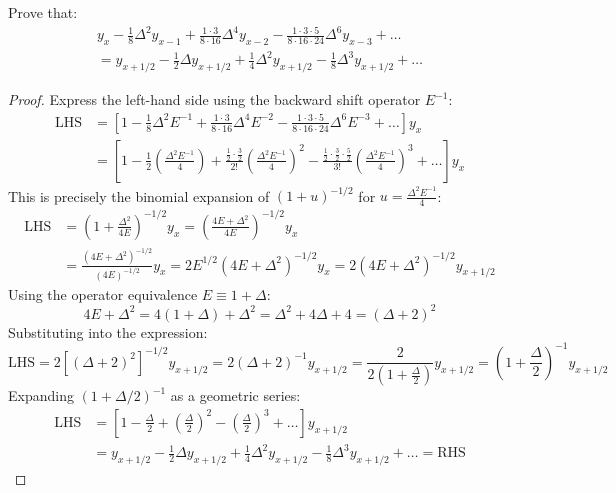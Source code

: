 \documentclass[11pt,a4paper]{article}
\begin{document}
\begin{theorembox}
Prove that:
\begin{multline}
    y_x - \frac{1}{8}\Delta^2 y_{x-1} + \frac{1 \cdot 3}{8 \cdot 16}\Delta^4 y_{x-2} - \frac{1 \cdot 3 \cdot 5}{8 \cdot 16 \cdot 24}\Delta^6 y_{x-3} + \dots \\
    = y_{x+1/2} - \frac{1}{2}\Delta y_{x+1/2} + \frac{1}{4}\Delta^2 y_{x+1/2} - \frac{1}{8}\Delta^3 y_{x+1/2} + \dots
\end{multline}
\end{theorembox}
\begin{proof}
Express the left-hand side using the backward shift operator $E^{-1}$:
\begin{align*}
    \text{LHS} &= \left[ 1 - \frac{1}{8}\Delta^2 E^{-1} + \frac{1 \cdot 3}{8 \cdot 16}\Delta^4 E^{-2} - \frac{1 \cdot 3 \cdot 5}{8 \cdot 16 \cdot 24}\Delta^6 E^{-3} + \dots \right] y_x \\
    &= \left[ 1 - \frac{1}{2}\left(\frac{\Delta^2 E^{-1}}{4}\right) + \frac{\frac{1}{2}\cdot\frac{3}{2}}{2!}\left(\frac{\Delta^2 E^{-1}}{4}\right)^2 - \frac{\frac{1}{2}\cdot\frac{3}{2}\cdot\frac{5}{2}}{3!}\left(\frac{\Delta^2 E^{-1}}{4}\right)^3 + \dots \right] y_x
\end{align*}
This is precisely the binomial expansion of $(1 + u)^{-1/2}$ for $u = \frac{\Delta^2 E^{-1}}{4}$:
\begin{align*}
    \text{LHS} &= \left( 1 + \frac{\Delta^2}{4E} \right)^{-1/2} y_x = \left( \frac{4E + \Delta^2}{4E} \right)^{-1/2} y_x \\
    &= \frac{(4E + \Delta^2)^{-1/2}}{(4E)^{-1/2}} y_x = 2 E^{1/2} (4E + \Delta^2)^{-1/2} y_x = 2(4E + \Delta^2)^{-1/2} y_{x+1/2}
\end{align*}
Using the operator equivalence $E \equiv 1 + \Delta$:
$$4E + \Delta^2 = 4(1 + \Delta) + \Delta^2 = \Delta^2 + 4\Delta + 4 = (\Delta + 2)^2$$
Substituting into the expression:
$$\text{LHS} = 2\left[ (\Delta + 2)^2 \right]^{-1/2} y_{x+1/2} = 2(\Delta + 2)^{-1} y_{x+1/2} = \frac{2}{2\left(1 + \frac{\Delta}{2}\right)} y_{x+1/2} = \left(1 + \frac{\Delta}{2}\right)^{-1} y_{x+1/2}$$
Expanding $(1 + \Delta/2)^{-1}$ as a geometric series:
\begin{align*}
    \text{LHS} &= \left[ 1 - \frac{\Delta}{2} + \left(\frac{\Delta}{2}\right)^2 - \left(\frac{\Delta}{2}\right)^3 + \dots \right] y_{x+1/2} \\
    &= y_{x+1/2} - \frac{1}{2}\Delta y_{x+1/2} + \frac{1}{4}\Delta^2 y_{x+1/2} - \frac{1}{8}\Delta^3 y_{x+1/2} + \dots = \text{RHS}
\end{align*}
\end{proof}
\end{document}
